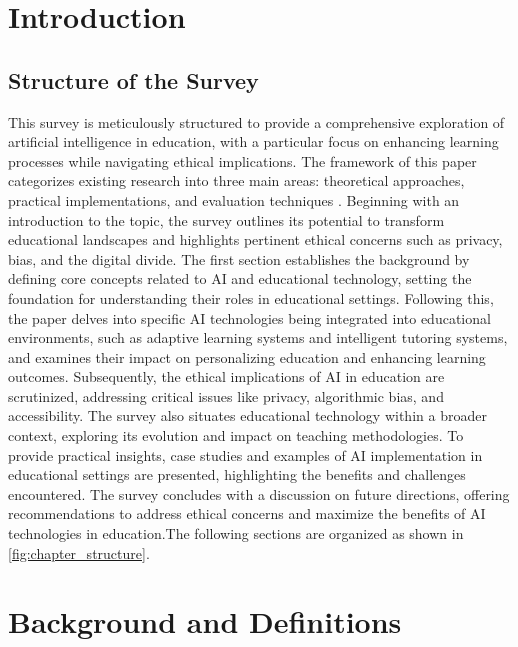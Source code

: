 \section{Introduction} \label{sec:Introduction}


\subsection{Structure of the Survey} \label{subsec:Structure of the Survey}

This survey is meticulously structured to provide a comprehensive exploration of artificial intelligence in education, with a particular focus on enhancing learning processes while navigating ethical implications. The framework of this paper categorizes existing research into three main areas: theoretical approaches, practical implementations, and evaluation techniques \cite{shanks2004speculationgraphcomputationarchitectures}. Beginning with an introduction to the topic, the survey outlines its potential to transform educational landscapes and highlights pertinent ethical concerns such as privacy, bias, and the digital divide. The first section establishes the background by defining core concepts related to AI and educational technology, setting the foundation for understanding their roles in educational settings. Following this, the paper delves into specific AI technologies being integrated into educational environments, such as adaptive learning systems and intelligent tutoring systems, and examines their impact on personalizing education and enhancing learning outcomes. Subsequently, the ethical implications of AI in education are scrutinized, addressing critical issues like privacy, algorithmic bias, and accessibility. The survey also situates educational technology within a broader context, exploring its evolution and impact on teaching methodologies. To provide practical insights, case studies and examples of AI implementation in educational settings are presented, highlighting the benefits and challenges encountered. The survey concludes with a discussion on future directions, offering recommendations to address ethical concerns and maximize the benefits of AI technologies in education.The following sections are organized as shown in \autoref{fig:chapter_structure}.








\section{Background and Definitions} \label{sec:Background and Definitions}



